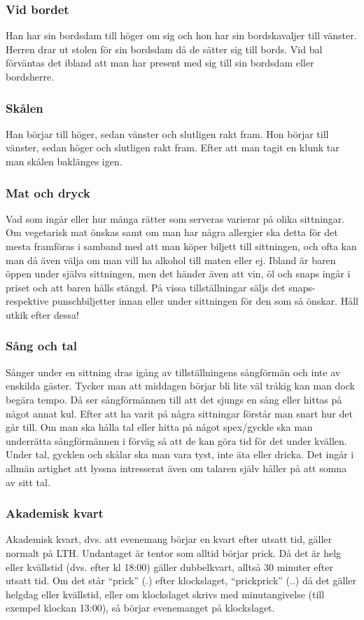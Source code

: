 \documentclass{article}
\begin{document}
\subsubsection{Vid bordet}
Han har sin bordsdam till höger om sig och hon har sin
bordskavaljer till vänster. Herren drar ut stolen för sin
bordsdam då de sätter sig till bords. Vid bal förväntas det
ibland att man har present med sig till sin bordsdam eller
bordsherre.

\subsubsection{Skålen}
Han börjar till höger, sedan vänster och slutligen rakt
fram. Hon börjar till vänster, sedan höger och slutligen
rakt fram. Efter att man tagit en klunk tar man skålen
baklänges igen.

\subsubsection{Mat och dryck}
Vad som ingår eller hur många rätter som serveras
varierar på olika sittningar. Om vegetarisk mat önskas
samt om man har några allergier ska detta för det mesta
framföras i samband med att man köper biljett till
sittningen, och ofta kan man då även välja om man vill ha
alkohol till maten eller ej.
Ibland är baren öppen under själva sittningen, men det
händer även att vin, öl och snaps ingår i priset och att
baren hålls stängd. På vissa tillställningar säljs det snaps-
respektive punschbiljetter innan eller under sittningen för
den som så önskar. Håll utkik efter dessa!

\subsubsection{Sång och tal}
Sånger under en sittning dras igång av tillställningens
sångförmän och inte av enskilda gäster. Tycker man att
middagen börjar bli lite väl tråkig kan man dock begära
tempo. Då ser sångförmännen till att det sjungs en sång
eller hittas på något annat kul. Efter att ha varit på några
sittningar förstår man snart hur det går till. Om man ska
hålla tal eller hitta på något spex/gyckle ska man
underrätta sångförmännen i förväg så att de kan göra tid
för det under kvällen. Under tal, gycklen och skålar ska
man vara tyst, inte äta eller dricka. Det ingår i allmän
artighet att lyssna intresserat även om talaren själv håller
på att somna av sitt tal.


\subsubsection{Akademisk kvart}
Akademisk kvart, dvs. att evenemang börjar en kvart efter
utsatt tid, gäller normalt på LTH. Undantaget är tentor
som alltid börjar prick. Då det är helg eller kvällstid (dvs.
efter kl 18:00) gäller dubbelkvart, alltså 30 minuter efter
utsatt tid. Om det står “prick” (.) efter klockslaget,
“prickprick” (..) då det gäller helgdag eller kvällstid, eller
om klockslaget skrivs med minutangivelse (till exempel klockan 13:00), så börjar evenemanget på klockslaget.
\newpage
\end{document}
